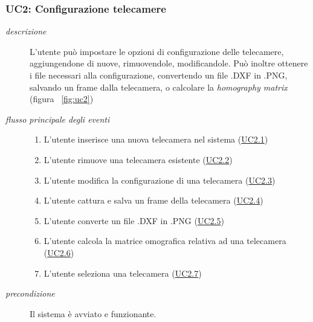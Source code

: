\subsubsection{UC2: Configurazione telecamere} \label{sec:UC2}
\begin{description}
\item[\em{descrizione }]L'utente può impostare le opzioni di configurazione delle telecamere, aggiungendone di nuove, rimuovendole, modificandole. Può inoltre ottenere i file necessari alla configurazione, convertendo un file .DXF in .PNG, salvando un frame dalla telecamera, o calcolare la \textit{homography matrix} (figura ~\ref{fig:uc2})
\item[\em{flusso principale degli eventi }] \mbox{}
 \begin{enumerate}
\item L'utente inserisce una nuova telecamera nel sistema (\hyperref[sec:uc2.1]{UC2.1})
\item L'utente rimuove una telecamera esistente (\hyperref[sec:uc2.2]{UC2.2})
\item L'utente modifica la configurazione di una telecamera (\hyperref[sec:uc2.3]{UC2.3})
\item L'utente cattura e salva un frame della telecamera (\hyperref[sec:uc2.4]{UC2.4})
\item L'utente converte un file .DXF in .PNG (\hyperref[sec:uc2.5]{UC2.5})
\item L'utente calcola la matrice omografica relativa ad una telecamera (\hyperref[sec:uc2.6]{UC2.6})
\item L'utente seleziona una telecamera (\hyperref[sec:uc2.7]{UC2.7})
\end{enumerate}
\item[\em{precondizione }] Il sistema è avviato e funzionante.
\end{description}

